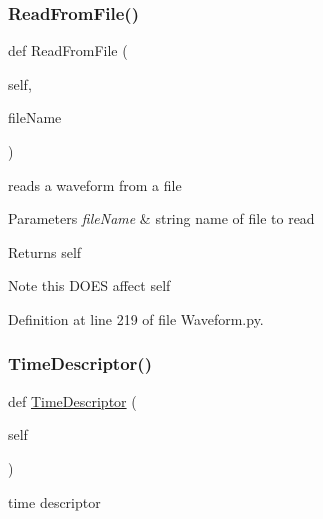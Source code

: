 \subsubsection{\texorpdfstring{Read\+From\+File()}{ReadFromFile()}}
{\footnotesize\ttfamily def Read\+From\+File (\begin{DoxyParamCaption}\item[{}]{self,  }\item[{}]{file\+Name }\end{DoxyParamCaption})}



reads a waveform from a file 


\begin{DoxyParams}{Parameters}
{\em file\+Name} & string name of file to read \\
\hline
\end{DoxyParams}
\begin{DoxyReturn}{Returns}
self 
\end{DoxyReturn}
\begin{DoxyNote}{Note}
this D\+O\+ES affect self 
\end{DoxyNote}


Definition at line 219 of file Waveform.\+py.

\mbox{\label{classSignalIntegrity_1_1TimeDomain_1_1Waveform_1_1Waveform_1_1Waveform_ab3bfca96556298bcd23762dfefbc7d6e}} 
\subsubsection{\texorpdfstring{Time\+Descriptor()}{TimeDescriptor()}}
{\footnotesize\ttfamily def \hyperlink{classSignalIntegrity_1_1TimeDomain_1_1Waveform_1_1TimeDescriptor_1_1TimeDescriptor}{Time\+Descriptor} (\begin{DoxyParamCaption}\item[{}]{self }\end{DoxyParamCaption})}



time descriptor 


